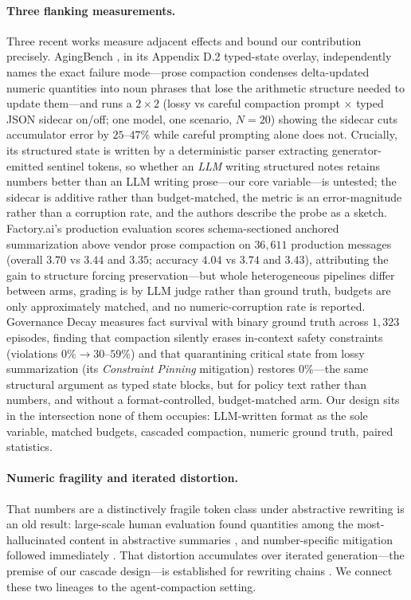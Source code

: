 \documentclass[11pt]{article}
\begin{document}
\paragraph{Three flanking measurements.}
Three recent works measure adjacent effects and bound our contribution
precisely. AgingBench \citep{zhu2026aging}, in its Appendix D.2 typed-state
overlay, independently names the exact failure mode---prose compaction
condenses delta-updated numeric quantities into noun phrases that lose the
arithmetic structure needed to update them---and runs a $2\times2$ (lossy vs
careful compaction prompt $\times$ typed JSON sidecar on/off; one model, one
scenario, $N=20$) showing the sidecar cuts accumulator error by $25$--$47\%$
while careful prompting alone does not. Crucially, its structured state is
written by a deterministic parser extracting generator-emitted sentinel
tokens, so whether an \emph{LLM} writing structured notes retains numbers
better than an LLM writing prose---our core variable---is untested; the
sidecar is additive rather than budget-matched, the metric is an
error-magnitude rather than a corruption rate, and the authors describe the
probe as a sketch. Factory.ai's production evaluation
\citep{factory2025compression} scores schema-sectioned anchored summarization
above vendor prose compaction on $36{,}611$ production messages (overall
$3.70$ vs $3.44$ and $3.35$; accuracy $4.04$ vs $3.74$ and $3.43$),
attributing the gain
to structure forcing preservation---but whole heterogeneous pipelines differ
between arms, grading is by LLM judge rather than ground truth, budgets are
only approximately matched, and no numeric-corruption rate is reported.
Governance Decay \citep{chen2026governance} measures fact survival with binary
ground truth across $1{,}323$ episodes, finding that compaction silently
erases in-context safety constraints (violations $0\%\rightarrow30$--$59\%$)
and that quarantining critical state from lossy summarization (its
\emph{Constraint Pinning} mitigation) restores $0\%$---the
same structural argument as typed state blocks, but for policy text rather
than numbers, and without a format-controlled, budget-matched arm. Our design
sits in the intersection none of them occupies: LLM-written format as the sole
variable, matched budgets, cascaded compaction, numeric ground truth, paired
statistics.

\paragraph{Numeric fragility and iterated distortion.}
That numbers are a distinctively fragile token class under abstractive
rewriting is an old result: large-scale human evaluation found quantities
among the most-hallucinated content in abstractive summaries
\citep{maynez2020faithfulness}, and number-specific mitigation followed
immediately \citep{zhao2020quantity}. That distortion accumulates over
iterated generation---the premise of our cascade design---is established for
rewriting chains \citep{mohamed2025brokentelephone}. We connect these two
lineages to the agent-compaction setting.
\end{document}
